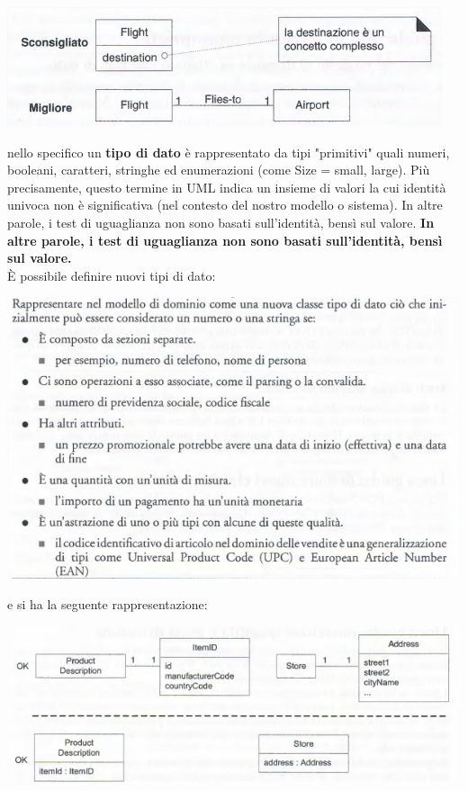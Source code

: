 \documentclass[a4paper,12pt, oneside]{book}
\begin{document}
\begin{center}
	\includegraphics[scale=0.7]{img/attd5.png}
\end{center}
nello specifico un \textbf{tipo di dato} è rappresentato da tipi "primitivi" quali numeri,
booleani, caratteri, stringhe ed enumerazioni (come Size = {small, large}). Più precisamente, questo termine in UML indica un insieme di valori la cui identità univoca non
è significativa (nel contesto del nostro modello o sistema). In altre parole, i test di uguaglianza non sono basati sull'identità, bensì sul valore. \textbf{In altre parole, i test di uguaglianza non sono basati sull'identità, bensì sul valore.}\\
È possibile definire nuovi tipi di dato:
\begin{center}
	\includegraphics[scale=0.7]{img/datd.png}
\end{center}
\newpage
e si ha la seguente rappresentazione:
\begin{center}
	\includegraphics[scale=0.7]{img/datd2.png}
\end{center}
\end{document}
